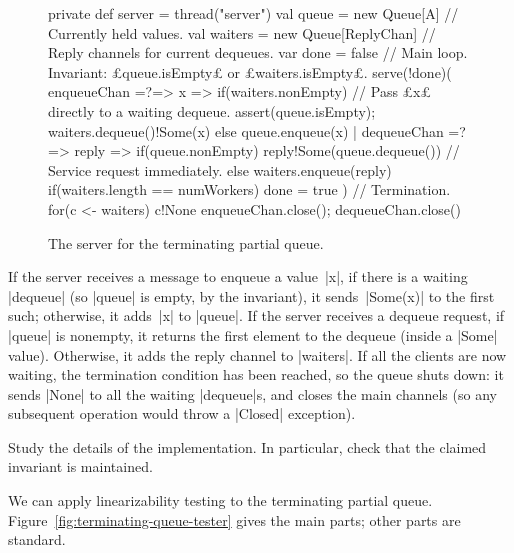\begin{figure}
\begin{scala}
  private def server = thread("server"){
    val queue = new Queue[A] // Currently held values.
    val waiters = new Queue[ReplyChan] // Reply channels for current dequeues.
    var done = false
    // Main loop.  Invariant: £queue.isEmpty£ or £waiters.isEmpty£.
    serve(!done)(
      enqueueChan =?=> { x => 
        if(waiters.nonEmpty){ // Pass £x£ directly to a waiting dequeue.
          assert(queue.isEmpty); waiters.dequeue()!Some(x)
        }
        else queue.enqueue(x)
      }
      | dequeueChan =?=> { reply =>
          if(queue.nonEmpty)
            reply!Some(queue.dequeue()) // Service request immediately.
          else{
            waiters.enqueue(reply)
            if(waiters.length == numWorkers) done = true
          }
        }
    )
    // Termination.
    for(c <- waiters) c!None
    enqueueChan.close(); dequeueChan.close()
  }
\end{scala}
\caption{The server for the terminating partial queue.}
\label{fig:terminating-queue-server}
\end{figure}



If the server receives a message to enqueue a value~|x|, if there is a waiting
|dequeue| (so |queue| is empty, by the invariant), it sends~|Some(x)| to the
first such; otherwise, it adds~|x| to |queue|.  If the server receives a
dequeue request, if |queue| is nonempty, it returns the first element to the
dequeue (inside a |Some| value).  Otherwise, it adds the reply channel to
|waiters|.  If all the clients are now waiting, the termination condition has
been reached, so the queue shuts down: it sends |None| to all the waiting
|dequeue|s, and closes the main channels (so any subsequent operation would
throw a |Closed| exception).

\begin{instruction}
Study the details of the implementation.  In particular, check that the
claimed invariant is maintained.
\end{instruction}


We can apply linearizability testing to the
terminating partial queue.  Figure~\ref{fig:terminating-queue-tester} gives
the main parts; other parts are standard.

